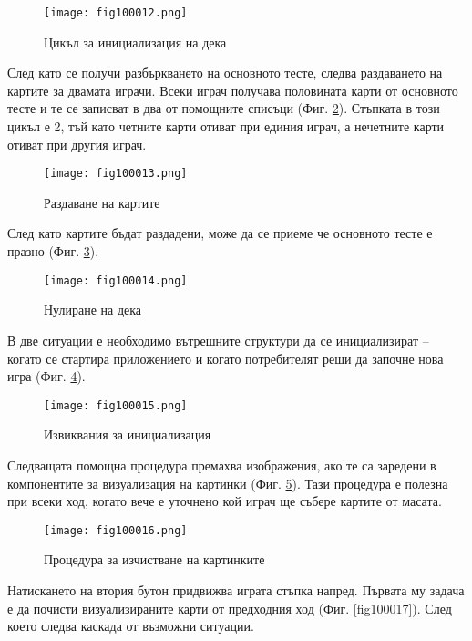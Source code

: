 \begin{figure}[H]
  \centering
  \texttt{[image: fig100012.png]}
  \caption{Цикъл за инициализация на дека}
\label{fig100012}
\end{figure}

След като се получи разбъркването на основното тесте, следва раздаването на картите за двамата играчи. Всеки играч получава половината карти от основното тесте и те се записват в два от помощните списъци (Фиг. \ref{fig100013}). Стъпката в този цикъл е 2, тъй като четните карти отиват при единия играч, а нечетните карти отиват при другия играч. 

\begin{figure}[H]
  \centering
  \texttt{[image: fig100013.png]}
  \caption{Раздаване на картите}
\label{fig100013}
\end{figure}

След като картите бъдат раздадени, може да се приеме че основното тесте е празно (Фиг. \ref{fig100014}). 

\begin{figure}[H]
  \centering
  \texttt{[image: fig100014.png]}
  \caption{Нулиране на дека}
\label{fig100014}
\end{figure}

В две ситуации е необходимо вътрешните структури да се инициализират – когато се стартира приложението и когато потребителят реши да започне нова игра (Фиг. \ref{fig100015}).

\begin{figure}[H]
  \centering
  \texttt{[image: fig100015.png]}
  \caption{Извиквания за инициализация}
\label{fig100015}
\end{figure}

Следващата помощна процедура премахва изображения, ако те са заредени в компонентите за визуализация на картинки (Фиг. \ref{fig100016}). Тази процедура е полезна при всеки ход, когато вече е уточнено кой играч ще събере картите от масата.

\begin{figure}[H]
  \centering
  \texttt{[image: fig100016.png]}
  \caption{Процедура за изчистване на картинките}
\label{fig100016}
\end{figure}

Натискането на втория бутон придвижва играта стъпка напред. Първата му задача е да почисти визуализираните карти от предходния ход (Фиг. \ref{fig100017}). След което следва каскада от възможни ситуации.

